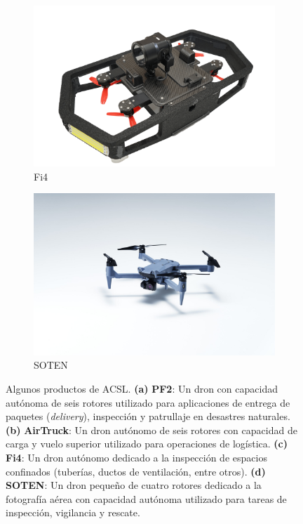 \begin{figure}
\begin{subfigure}[b]{0.45\textwidth}
        \includegraphics[width=\textwidth]{partes/ImgJoao/Fi4.png}
        \caption{Fi4}
        \label{fig:Fi4}
    \end{subfigure}
    \hfill
    \begin{subfigure}[b]{0.45\textwidth}
        \centering
        \includegraphics[width=\textwidth]{partes/ImgJoao/SOTEN.jpg}
        \caption{SOTEN}
        \label{fig:SOTEN_ACSL}
    \end{subfigure}
    \hfill
    
    \caption [Algunos productos de ACSL]{Algunos productos de ACSL. \textbf{(a)} \textbf{PF2}: Un dron con capacidad autónoma de seis rotores utilizado para aplicaciones de entrega de paquetes (\textit{delivery}), inspección y patrullaje en desastres naturales. \textbf{(b)} \textbf{AirTruck}: Un dron autónomo de seis rotores con capacidad de carga y vuelo superior utilizado para operaciones de logística. \textbf{(c)} \textbf{Fi4}: Un dron autónomo dedicado a la inspección de espacios confinados (tuberías, ductos de ventilación, entre otros). \textbf{(d)} \textbf{SOTEN}: Un dron pequeño de cuatro rotores dedicado a la fotografía aérea con capacidad autónoma utilizado para tareas de inspección, vigilancia y rescate. }
    \label{fig:acsl-products}
\end{figure}


